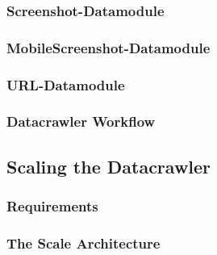 \subsubsection{Screenshot-Datamodule}
\label{datacrawler_screenshot_datamodule}

\subsubsection{MobileScreenshot-Datamodule}
\label{datacrawler_mobilescreenshot_datamodule}

\subsubsection{URL-Datamodule}
\label{datacrawler_url_datamodule}


\subsubsection{Datacrawler Workflow}
\label{datacrawler_workflow}

\subsection{Scaling the Datacrawler}
\label{datacrawler_scale}

\subsubsection{Requirements}
\label{datacrawler_scale_requirements}

\subsubsection{The Scale Architecture}
\label{datacrawler_scale_architecture}


